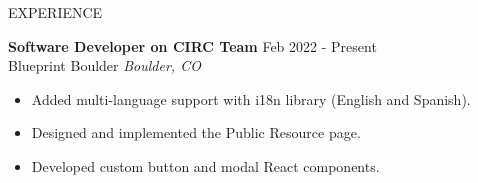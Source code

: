 \documentclass{resume} %
\begin{document}
\begin{rSection}{EXPERIENCE}

\textbf{Software Developer on CIRC Team} \hfill Feb 2022 - Present\\
Blueprint Boulder \hfill \textit{Boulder, CO}
 \begin{itemize}
    \itemsep -3pt {} 
     \item Added multi-language support with i18n library (English and Spanish).
     \item Designed and implemented the Public Resource page.
    \item Developed custom button and modal React components. 
 \end{itemize}
\end{rSection} 

\end{document}
